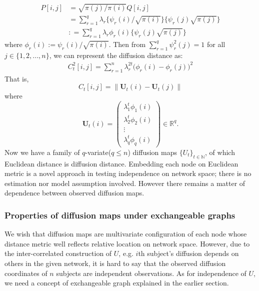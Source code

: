 \documentclass[12pt]{article}
\theoremstyle{definition}
\begin{document}
\begin{equation}
\begin{split}
P[i,j] &  = \sqrt{\pi(j) / \pi(i) } Q[i,j] \\ &   = \sum\limits_{r=1}^{q} \lambda_{r} \big\{ \psi_{r}(i) / \sqrt{\pi(i)}  \big\} \big\{ \psi_{r}(j) \sqrt{\pi(j)} \big\}  \\ & : = \sum\limits_{r=1}^{q} \lambda_{r} \phi_{r}(i) \big\{ \psi_{r}(j) \sqrt{\pi(j)} \big\}
\end{split}
\end{equation}
where $\phi_{r}(i) := \psi_{r}(i) / \sqrt{\pi(i)}$. Then from $\sum\limits_{r=1}^{q} \psi^2_{r}(j) = 1$ for all $j \in \{1,2,...,n\}$, 
we can represent the diffusion distance as: 	
\begin{equation}
\begin{split}
C^2_{t}[i,j]  = \sum\limits_{r=1}^{n} \lambda^{2t}_{r} \big( \phi_{r} (i) - \phi_{r}(j)   \big)^2  
\end{split}
\end{equation}
That is,
\begin{equation}
C_{t}[i,j] = \parallel \boldsymbol{U}_{t}(i) - \boldsymbol{U}_{t}(j) \parallel
\end{equation}
where 
\begin{equation} 
\boldsymbol{U}_{t}(i) = \begin{pmatrix} \lambda^{t}_{1} \phi_{1}(i) \\ \lambda^{t}_{2} \phi_{2} (i)  \\ \vdots \\ \lambda^{t}_{q} \phi_{q}(i) \end{pmatrix} \in \mathbb{R}^{q}.
\end{equation}
Now we have  a family of $q$-variate($q \leq n$) diffusion maps $\{ U_{t} \}_{t \in \mathbb{N}} $, of which Euclidean distance is diffusion distance. Embedding each node on Euclidean metric is a novel approach in testing independence on network space; there is no estimation nor model assumption involved. However there remains a matter of dependence between observed diffusion maps.
	
\subsubsection{Properties of diffusion maps under exchangeable graphs}

We wish that diffusion maps are multivariate configuration of each node whose distance metric well reflects relative location on network space. However, due to the inter-correlated construction of $U$, e.g. $i$th subject's diffusion depends on others in the given network, it is hard to say that the observed diffusion coordinates of $n$ subjects are independent observations. As for independence of $U$, we need a concept of exchangeable graph explained in the earlier section. 
\end{document}
